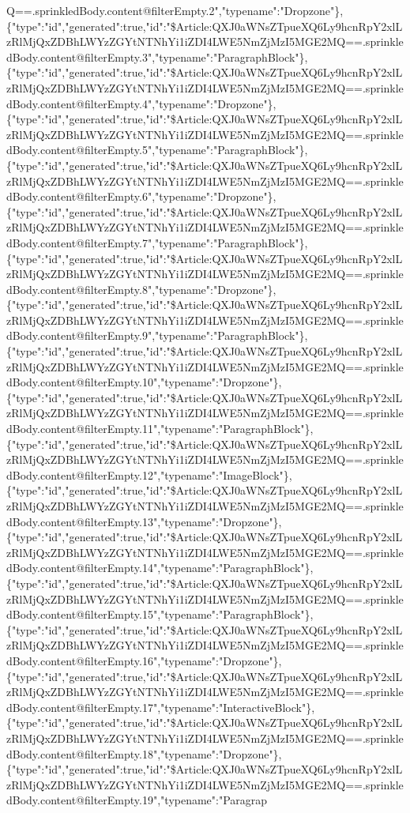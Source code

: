 Q==.sprinkledBody.content@filterEmpty.2","typename":"Dropzone"\},\{"type":"id","generated":true,"id":"\$Article:QXJ0aWNsZTpueXQ6Ly9hcnRpY2xlLzRlMjQxZDBhLWYzZGYtNTNhYi1iZDI4LWE5NmZjMzI5MGE2MQ==.sprinkledBody.content@filterEmpty.3","typename":"ParagraphBlock"\},\{"type":"id","generated":true,"id":"\$Article:QXJ0aWNsZTpueXQ6Ly9hcnRpY2xlLzRlMjQxZDBhLWYzZGYtNTNhYi1iZDI4LWE5NmZjMzI5MGE2MQ==.sprinkledBody.content@filterEmpty.4","typename":"Dropzone"\},\{"type":"id","generated":true,"id":"\$Article:QXJ0aWNsZTpueXQ6Ly9hcnRpY2xlLzRlMjQxZDBhLWYzZGYtNTNhYi1iZDI4LWE5NmZjMzI5MGE2MQ==.sprinkledBody.content@filterEmpty.5","typename":"ParagraphBlock"\},\{"type":"id","generated":true,"id":"\$Article:QXJ0aWNsZTpueXQ6Ly9hcnRpY2xlLzRlMjQxZDBhLWYzZGYtNTNhYi1iZDI4LWE5NmZjMzI5MGE2MQ==.sprinkledBody.content@filterEmpty.6","typename":"Dropzone"\},\{"type":"id","generated":true,"id":"\$Article:QXJ0aWNsZTpueXQ6Ly9hcnRpY2xlLzRlMjQxZDBhLWYzZGYtNTNhYi1iZDI4LWE5NmZjMzI5MGE2MQ==.sprinkledBody.content@filterEmpty.7","typename":"ParagraphBlock"\},\{"type":"id","generated":true,"id":"\$Article:QXJ0aWNsZTpueXQ6Ly9hcnRpY2xlLzRlMjQxZDBhLWYzZGYtNTNhYi1iZDI4LWE5NmZjMzI5MGE2MQ==.sprinkledBody.content@filterEmpty.8","typename":"Dropzone"\},\{"type":"id","generated":true,"id":"\$Article:QXJ0aWNsZTpueXQ6Ly9hcnRpY2xlLzRlMjQxZDBhLWYzZGYtNTNhYi1iZDI4LWE5NmZjMzI5MGE2MQ==.sprinkledBody.content@filterEmpty.9","typename":"ParagraphBlock"\},\{"type":"id","generated":true,"id":"\$Article:QXJ0aWNsZTpueXQ6Ly9hcnRpY2xlLzRlMjQxZDBhLWYzZGYtNTNhYi1iZDI4LWE5NmZjMzI5MGE2MQ==.sprinkledBody.content@filterEmpty.10","typename":"Dropzone"\},\{"type":"id","generated":true,"id":"\$Article:QXJ0aWNsZTpueXQ6Ly9hcnRpY2xlLzRlMjQxZDBhLWYzZGYtNTNhYi1iZDI4LWE5NmZjMzI5MGE2MQ==.sprinkledBody.content@filterEmpty.11","typename":"ParagraphBlock"\},\{"type":"id","generated":true,"id":"\$Article:QXJ0aWNsZTpueXQ6Ly9hcnRpY2xlLzRlMjQxZDBhLWYzZGYtNTNhYi1iZDI4LWE5NmZjMzI5MGE2MQ==.sprinkledBody.content@filterEmpty.12","typename":"ImageBlock"\},\{"type":"id","generated":true,"id":"\$Article:QXJ0aWNsZTpueXQ6Ly9hcnRpY2xlLzRlMjQxZDBhLWYzZGYtNTNhYi1iZDI4LWE5NmZjMzI5MGE2MQ==.sprinkledBody.content@filterEmpty.13","typename":"Dropzone"\},\{"type":"id","generated":true,"id":"\$Article:QXJ0aWNsZTpueXQ6Ly9hcnRpY2xlLzRlMjQxZDBhLWYzZGYtNTNhYi1iZDI4LWE5NmZjMzI5MGE2MQ==.sprinkledBody.content@filterEmpty.14","typename":"ParagraphBlock"\},\{"type":"id","generated":true,"id":"\$Article:QXJ0aWNsZTpueXQ6Ly9hcnRpY2xlLzRlMjQxZDBhLWYzZGYtNTNhYi1iZDI4LWE5NmZjMzI5MGE2MQ==.sprinkledBody.content@filterEmpty.15","typename":"ParagraphBlock"\},\{"type":"id","generated":true,"id":"\$Article:QXJ0aWNsZTpueXQ6Ly9hcnRpY2xlLzRlMjQxZDBhLWYzZGYtNTNhYi1iZDI4LWE5NmZjMzI5MGE2MQ==.sprinkledBody.content@filterEmpty.16","typename":"Dropzone"\},\{"type":"id","generated":true,"id":"\$Article:QXJ0aWNsZTpueXQ6Ly9hcnRpY2xlLzRlMjQxZDBhLWYzZGYtNTNhYi1iZDI4LWE5NmZjMzI5MGE2MQ==.sprinkledBody.content@filterEmpty.17","typename":"InteractiveBlock"\},\{"type":"id","generated":true,"id":"\$Article:QXJ0aWNsZTpueXQ6Ly9hcnRpY2xlLzRlMjQxZDBhLWYzZGYtNTNhYi1iZDI4LWE5NmZjMzI5MGE2MQ==.sprinkledBody.content@filterEmpty.18","typename":"Dropzone"\},\{"type":"id","generated":true,"id":"\$Article:QXJ0aWNsZTpueXQ6Ly9hcnRpY2xlLzRlMjQxZDBhLWYzZGYtNTNhYi1iZDI4LWE5NmZjMzI5MGE2MQ==.sprinkledBody.content@filterEmpty.19","typename":"Paragrap
